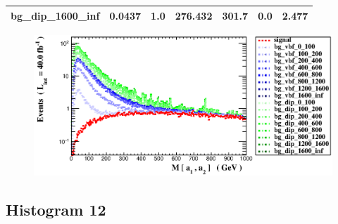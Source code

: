 \documentclass[a4paper, 10pt]{article}
\begin{document}
\begin{table}[H]
\begin{center}
\begin{tabular}{|m{23.0mm}|m{23.0mm}|m{18.0mm}|m{19.0mm}|m{19.0mm}|m{19.0mm}|m{19.0mm}|}
      \hline
      {\cellcolor{white}         bg\_dip\_1600\_inf}& {\cellcolor{white}         0.0437}& {\cellcolor{white}         1.0}& {\cellcolor{white}         276.432}& {\cellcolor{white}         301.7}& {\cellcolor{green}         0.0}& {\cellcolor{green}         2.477}\\
\hline
    \end{tabular}
  \end{center}
\end{table}

\begin{figure}[H]
  \begin{center}
    \includegraphics[scale=0.45]{selection_10.eps}\\
\caption{   }
  \end{center}
\end{figure}
      \newpage
\subsection{ Histogram 12}
\end{document}
